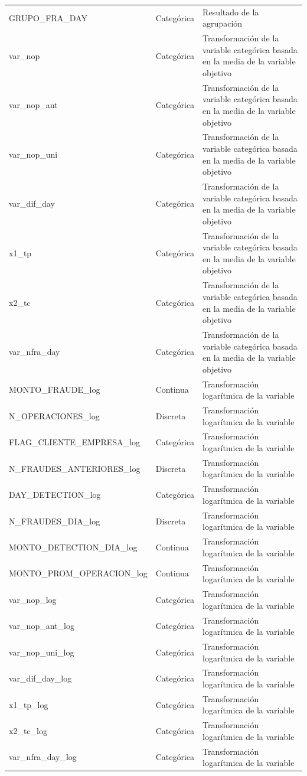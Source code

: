 \documentclass[
	11pt, %
	spanish, %
]{fphw}
\begin{document}
\begin{landscape}
\begin{table}[]
\begin{tabular}{lll}
GRUPO\_FRA\_DAY & Categórica & Resultado de la agrupación \\
var\_nop & Categórica & Transformación de la variable categórica basada en la media de la variable objetivo \\
var\_nop\_ant & Categórica & Transformación de la variable categórica basada en la media de la variable objetivo \\
var\_nop\_uni & Categórica & Transformación de la variable categórica basada en la media de la variable objetivo \\
var\_dif\_day & Categórica & Transformación de la variable categórica basada en la media de la variable objetivo \\
x1\_tp & Categórica & Transformación de la variable categórica basada en la media de la variable objetivo \\
x2\_tc & Categórica & Transformación de la variable categórica basada en la media de la variable objetivo \\
var\_nfra\_day & Categórica & Transformación de la variable categórica basada en la media de la variable objetivo \\
MONTO\_FRAUDE\_log & Continua & Transformación logarítmica de la variable \\
N\_OPERACIONES\_log & Discreta & Transformación logarítmica de la variable \\
FLAG\_CLIENTE\_EMPRESA\_log & Categórica & Transformación logarítmica de la variable \\
N\_FRAUDES\_ANTERIORES\_log & Discreta & Transformación logarítmica de la variable \\
DAY\_DETECTION\_log & Categórica & Transformación logarítmica de la variable \\
N\_FRAUDES\_DIA\_log & Discreta & Transformación logarítmica de la variable \\
MONTO\_DETECTION\_DIA\_log & Continua & Transformación logarítmica de la variable \\
MONTO\_PROM\_OPERACION\_log & Continua & Transformación logarítmica de la variable \\
var\_nop\_log & Categórica & Transformación logarítmica de la variable \\
var\_nop\_ant\_log & Categórica & Transformación logarítmica de la variable \\
var\_nop\_uni\_log & Categórica & Transformación logarítmica de la variable \\
var\_dif\_day\_log & Categórica & Transformación logarítmica de la variable \\
x1\_tp\_log & Categórica & Transformación logarítmica de la variable \\
x2\_tc\_log & Categórica & Transformación logarítmica de la variable \\
var\_nfra\_day\_log & Categórica & Transformación logarítmica de la variable
\end{tabular}
\end{table}
\end{landscape}
\end{document}
